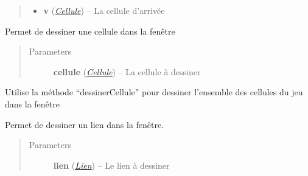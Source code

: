 \documentclass[letterpaper,10pt,english]{sphinxmanual}
\begin{document}
\begin{fulllineitems}
\begin{fulllineitems}
\begin{quote}
\begin{description}
\begin{itemize}
\item {} 
\textbf{v} ({\hyperref[index:module-Cellule]{\emph{Cellule}}}) -- La cellule d'arrivée

\end{itemize}

\end{description}\end{quote}

\end{fulllineitems}


\begin{fulllineitems}
\label{index:Graphique.Graphique.dessinerCellule}
Permet de dessiner une cellule dans la fenêtre
\begin{quote}\begin{description}
\item[{Parameters}] \leavevmode
\textbf{cellule} ({\hyperref[index:module-Cellule]{\emph{Cellule}}}) -- La cellule à dessiner

\end{description}\end{quote}

\end{fulllineitems}


\begin{fulllineitems}
\label{index:Graphique.Graphique.dessinerCellules}
Utilise la méthode ``dessinerCellule'' pour dessiner l'ensemble des cellules du jeu dans la fenêtre

\end{fulllineitems}


\begin{fulllineitems}
\label{index:Graphique.Graphique.dessinerLien}
Permet de dessiner un lien dans la fenêtre.
\begin{quote}\begin{description}
\item[{Parameters}] \leavevmode
\textbf{lien} ({\hyperref[index:module-Lien]{\emph{Lien}}}) -- Le lien à dessiner

\end{description}\end{quote}


\end{fulllineitems}
\end{fulllineitems}
\end{document}
